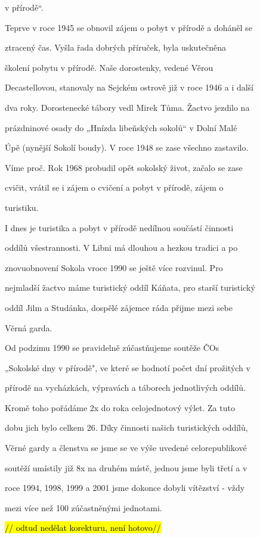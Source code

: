v přírodě``.

Teprve v roce 1945 se obnovil zájem o pobyt v přírodě a doháněl se

ztracený čas. Vyšla řada dobrých příruček, byla uskutečněna

školení pobytu v přírodě. Naše dorostenky, vedené Věrou

Decastellovou, stanovaly na Sejckém ostrově již v roce 1946 a i další

dva roky. Dorostenecké tábory vedl Mirek Tůma. Žactvo jezdilo na

prázdninové osady do „Hnízda libeňských sokolů`` v Dolní Malé

Úpě (nynější Sokolí boudy). V roce 1948 se zase všechno zastavilo.

Víme proč. Rok 1968 probudil opět sokolský život, začalo se zase

cvičit, vrátil se i zájem o cvičení a pobyt v přírodě, zájem o

turistiku.

I dnes je turistika a pobyt v přírodě nedílnou součástí činnosti

oddílů všestrannosti. V Libni má dlouhou a hezkou tradici a po

znovuobnovení Sokola vroce 1990 se ještě více rozvinul. Pro

nejmladší žactvo máme turistický oddíl Káňata, pro starší turistický

oddíl Jilm a Studánka, dospělé zájemce ráda přijme mezi sebe

Věrná garda.

Od podzimu 1990 se pravidelně zúčastňujeme soutěže ČOs

„Sokolské dny v přírodě", ve které se hodnotí počet dní prožitých v

přírodě na vycházkách, výpravách a táborech jednotlivých oddílů.

Kromě toho pořádáme 2x do roka celojednotový výlet. Za tuto

dobu jich bylo celkem 26. Díky činnosti našich turistických oddílů,

Věrné gardy a členstva se jsme se ve výše uvedené celorepublikové

soutěží umístily již 8x na druhém místě, jednou jsme byli třetí a v

roce 1994, 1998, 1999 a 2001 jsme dokonce dobyli vítězství - vždy

mezi více než 100 zúčastněnými jednotami.

\hl{// odtud nedělat korekturu, není hotovo//}

